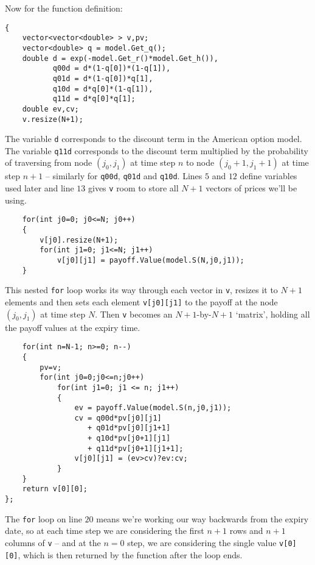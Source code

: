 \documentclass[12pt,a4paper]{article}
\begin{document}
Now for the function definition:
\begin{lstlisting}
{
    vector<vector<double> > v,pv;
    vector<double> q = model.Get_q();
    double d = exp(-model.Get_r()*model.Get_h()),
           q00d = d*(1-q[0])*(1-q[1]),
           q01d = d*(1-q[0])*q[1],
           q10d = d*q[0]*(1-q[1]),
           q11d = d*q[0]*q[1];
    double ev,cv;
    v.resize(N+1);
\end{lstlisting}

The variable \texttt{d} corresponds to the discount term in the American option 
model.
The variable \texttt{q11d} corresponds to the discount term multiplied by the 
probability of traversing from node $(j_0,j_1)$ at time step $n$ to node 
$(j_0+1,j_1+1)$ at time step $n+1$ -- similarly for \texttt{q00d}, \texttt{q01d} 
and \texttt{q10d}.
Lines $5$ and $12$ define variables used later and line $13$ gives \texttt{v} 
room to store all $N+1$ vectors of prices we'll be using.



\begin{lstlisting}
    for(int j0=0; j0<=N; j0++)
    {
        v[j0].resize(N+1);
        for(int j1=0; j1<=N; j1++)
            v[j0][j1] = payoff.Value(model.S(N,j0,j1));
    }
\end{lstlisting}

This nested \texttt{for} loop works its way through each vector in \texttt{v}, 
resizes it to $N+1$ elements and then sets each element \texttt{v[j0][j1]} to 
the payoff at the node $(j_0,j_1)$ at time step $N$.
Then \texttt{v} becomes an $N+1$-by-$N+1$ `matrix', holding all the payoff 
values at the expiry time.

\begin{lstlisting}    
    for(int n=N-1; n>=0; n--)
    {
        pv=v;
        for(int j0=0;j0<=n;j0++)
            for(int j1=0; j1 <= n; j1++)
            {
                ev = payoff.Value(model.S(n,j0,j1));
                cv = q00d*pv[j0][j1]
                   + q01d*pv[j0][j1+1]
                   + q10d*pv[j0+1][j1]
                   + q11d*pv[j0+1][j1+1];
                v[j0][j1] = (ev>cv)?ev:cv;
            }
    }
    return v[0][0];
};
\end{lstlisting}

The \texttt{for} loop on line $20$ means we're working our way backwards from the expiry date, so at each time step we are considering the first $n+1$ rows and $n+1$ columns of \texttt{v} -- and at the $n=0$ step, we are considering the single value \texttt{v[0][0]}, which is then returned by the function after the loop ends.
\end{document}
